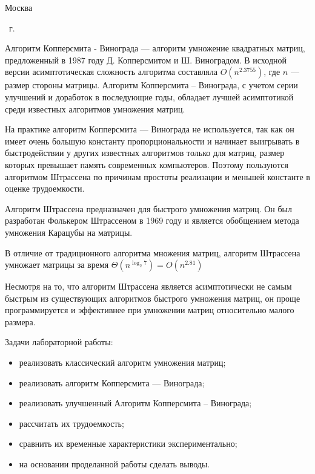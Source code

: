 \begin{center}
	\mbox{}
	\vfill
	Москва
\end{center}

\begin{center}
	\the\year ~г.
\end{center}
\clearpage

\renewcommand\contentsname{\hfill{\normalfont{СОДЕРЖАНИЕ}}\hfill}  %
\tableofcontents
\newpage


Алгоритм Копперсмита - Винограда --- алгоритм умножение квадратных матриц, предложенный в 1987 году Д. Копперсмитом и Ш. Виноградом. В исходной версии асимптотическая сложность алгоритма составляла $O(n^{2.3755})$, где $n$ --- размер стороны матрицы. Алгоритм Копперсмита -- Винограда, с учетом серии улучшений и доработок в последующие годы, обладает лучшей асимптотикой среди известных алгоритмов умножения матриц.

На практике алгоритм Копперсмита — Винограда не используется, так как он имеет очень большую константу пропорциональности и начинает выигрывать в быстродействии у других известных алгоритмов только для матриц, размер которых превышает память современных компьютеров. Поэтому пользуются алгоритмом Штрассена по причинам простоты реализации и меньшей константе в оценке трудоемкости.


Алгоритм Штрассена предназначен для быстрого умножения матриц. Он был разработан Фолькером Штрассеном в 1969 году и является обобщением метода умножения Карацубы на матрицы.

В отличие от традиционного алгоритма множения матриц, алгоритм Штрассена умножает матрицы за время $\Theta(n^{\log_2{7}}) = O(n^{2.81})$

Несмотря на то, что алгоритм Штрассена является асимптотически не самым быстрым из существующих алгоритмов быстрого умножения матриц, он проще программируется и эффективнее при умножении матриц относительно малого размера.

Задачи лабораторной работы:

\begin{itemize}
    \item реализовать классический алгоритм умножения матриц;
    \item реализовать алгоритм Копперсмита — Винограда;
    \item реализовать улучшенный Алгоритм Копперсмита -- Винограда;
    \item рассчитать их трудоемкость;
    \item сравнить их временные характеристики экспериментально;
    \item на основании проделанной работы сделать выводы.
\end{itemize}

